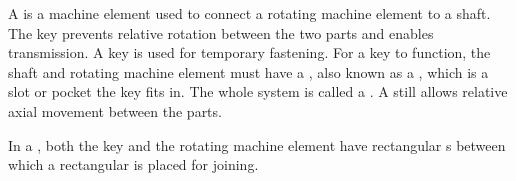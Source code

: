 \begin{module}[id=keyed-joint]
  \begin{definition}
    A  is a machine element used to connect a rotating machine element to a
    shaft. The key prevents relative rotation between the two parts and enables
     transmission. A key is used for temporary fastening. For a key
    to function, the shaft and rotating machine element must have a , also
    known as a , which is a slot or pocket the key fits in. The
    whole system is called a . A  still allows
    relative axial movement between the parts.
  \end{definition}

  \begin{definition}
    In a , both the key and the rotating machine element have
    rectangular s between which a rectangular  is placed for
    joining.
  \end{definition}
\end{module}
